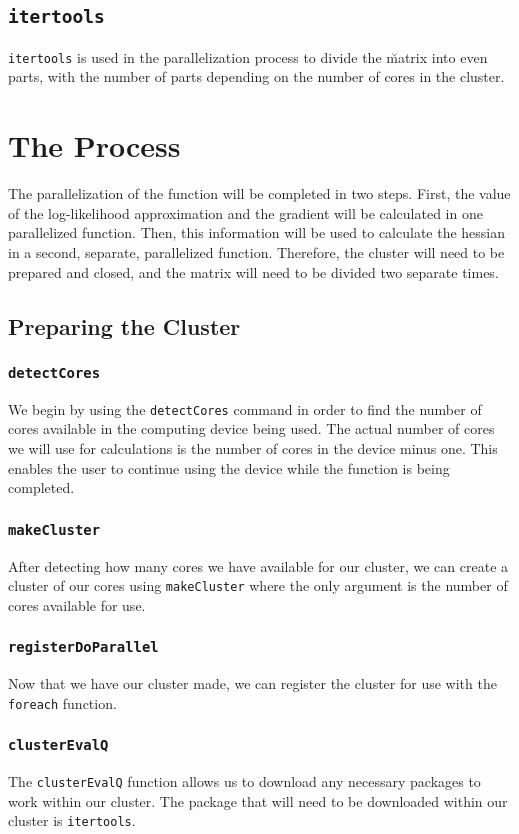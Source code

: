 \documentclass{article}
\begin{document}
\subsection{\texttt{itertools}}
\texttt{itertools} is used in the parallelization process to divide the \u matrix into even parts, with the number of parts depending on the number of cores in the cluster. 

\section{The Process}
The parallelization of the function will be completed in two steps. First, the value of the log-likelihood approximation and the gradient will be calculated in one parallelized function. Then, this information will be used to calculate the hessian in a second, separate, parallelized function. Therefore, the cluster will need to be prepared and closed, and the matrix will need to be divided two separate times. 

\subsection{Preparing the Cluster}
\subsubsection{\texttt{detectCores}}
We begin by using the \texttt{detectCores} command in order to find the number of cores available in the computing device being used. The actual number of cores we will use for calculations is the number of cores in the device minus one. This enables the user to continue using the device while the function is being completed. 

\subsubsection{\texttt{makeCluster}}
After detecting how many cores we have available for our cluster, we can create a cluster of our cores using \texttt{makeCluster} where the only argument is the number of cores available for use. 

\subsubsection{\texttt{registerDoParallel}}
Now that we have our cluster made, we can register the cluster for use with the \texttt{foreach} function.

\subsubsection{\texttt{clusterEvalQ}}
The \texttt{clusterEvalQ} function allows us to download any necessary packages to work within our cluster. The package that will need to be downloaded within our cluster is \texttt{itertools}.
\end{document}
